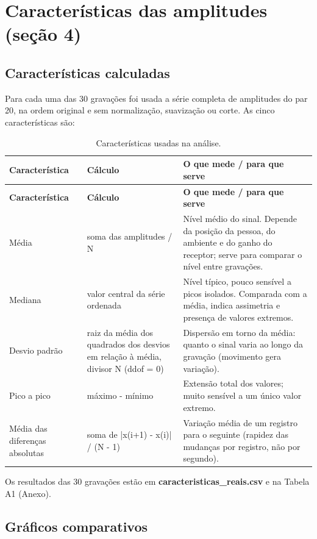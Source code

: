 \section{Características das amplitudes (seção 4)}

\subsection{Características calculadas}

Para cada uma das 30 gravações foi usada a série completa de amplitudes do par 20, na ordem original e sem normalização, suavização ou corte. As cinco características são:

{\footnotesize
\begin{longtable}{|>{\centering\arraybackslash}p{2.84cm}|>{\centering\arraybackslash}p{4.57cm}|>{\centering\arraybackslash}p{7.24cm}|}
\caption{Características usadas na análise.}\\
\hline
\textbf{Característica} & \textbf{Cálculo} & \textbf{O que mede / para que serve} \\ \hline
\endfirsthead
\hline
\textbf{Característica} & \textbf{Cálculo} & \textbf{O que mede / para que serve} \\ \hline
\endhead
Média & soma das amplitudes / N & Nível médio do sinal. Depende da posição da pessoa, do ambiente e do ganho do receptor; serve para comparar o nível entre gravações. \\ \hline
Mediana & valor central da série ordenada & Nível típico, pouco sensível a picos isolados. Comparada com a média, indica assimetria e presença de valores extremos. \\ \hline
Desvio padrão & raiz da média dos quadrados dos desvios em relação à média, divisor N (ddof = 0) & Dispersão em torno da média: quanto o sinal varia ao longo da gravação (movimento gera variação). \\ \hline
Pico a pico & máximo - mínimo & Extensão total dos valores; muito sensível a um único valor extremo. \\ \hline
Média das diferenças absolutas & soma de |x(i+1) - x(i)| / (N - 1) & Variação média de um registro para o seguinte (rapidez das mudanças por registro, não por segundo). \\ \hline
\end{longtable}
}

Os resultados das 30 gravações estão em \textbf{caracteristicas\_reais.csv} e na Tabela A1 (Anexo).

\subsection{Gráficos comparativos}

